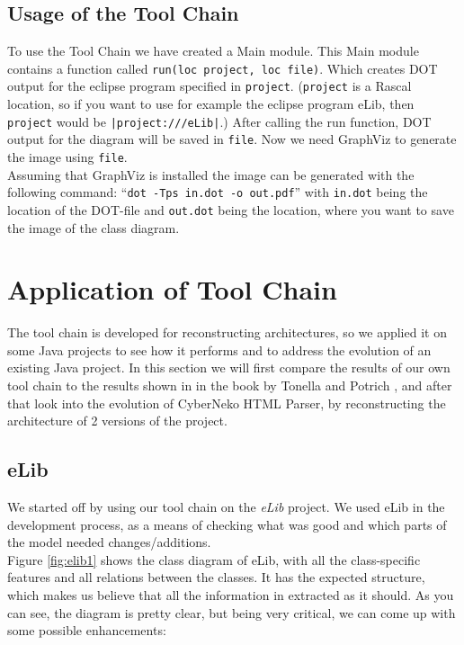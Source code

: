 \documentclass[a4paper,11pt]{article}
\begin{document}
		\subsection{Usage of the Tool Chain}
			To use the Tool Chain we have created a Main module. This Main module contains a function called \texttt{run(loc project, loc file)}. Which creates DOT output for the eclipse program specified in \texttt{project}. (\texttt{project} is a Rascal location, so if you want to use for example the eclipse program eLib, then \texttt{project} would be \texttt{|project:///eLib|}.) After calling the run function, DOT output for the diagram will be saved in \texttt{file}. Now we need GraphViz to generate the image using \texttt{file}. \\
	
			Assuming that GraphViz is installed the image can be generated with the following command: ``\texttt{dot -Tps in.dot -o out.pdf}'' with \texttt{in.dot} being the location of the DOT-file and \texttt{out.dot} being the location, where you want to save the image of the class diagram.
	
	\section{Application of Tool Chain}
		The tool chain is developed for reconstructing architectures, so we applied it on some Java projects to see how it performs and to address the evolution of an existing Java project. In this section we will first compare the results of our own tool chain to the results shown in in the book by Tonella and Potrich \cite{tonella}, and after that look into the evolution of CyberNeko HTML Parser, by reconstructing the architecture of 2 versions of the project.
		
		\subsection{eLib}
			We started off  by using our tool chain on the \emph{eLib} project. We used eLib in the development process, as a means of checking what was good and which parts of the model needed changes/additions. \\

			Figure \ref{fig:elib1} shows the class diagram of eLib, with all the class-specific features and all relations between the classes. It has the expected structure, which makes us believe that all the information in extracted as it should. As you can see, the diagram is pretty clear, but being very critical, we can come up with some possible enhancements:
			
\end{document}
